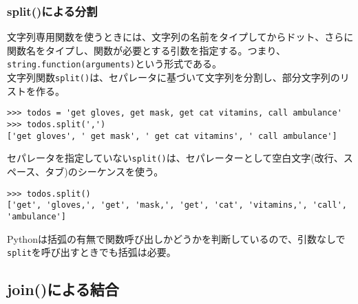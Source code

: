 \documentclass[11pt, oneside]{article}   	%
\begin{document}
 \subsubsection{split()による分割}
 文字列専用関数を使うときには、文字列の名前をタイプしてからドット、さらに関数名をタイプし、関数が必要とする引数を指定する。つまり、\verb|string.function(arguments)|という形式である。\\
 文字列関数\verb|split()|は、セパレータに基づいて文字列を分割し、部分文字列のリストを作る。
 \begin{lstlisting}
>>> todos = 'get gloves, get mask, get cat vitamins, call ambulance'
>>> todos.split(',')
['get gloves', ' get mask', ' get cat vitamins', ' call ambulance']
 \end{lstlisting}
 セパレータを指定していない\verb|split()|は、セパレーターとして空白文字(改行、スペース、タブ)のシーケンスを使う。
 \begin{lstlisting}
>>> todos.split()
['get', 'gloves,', 'get', 'mask,', 'get', 'cat', 'vitamins,', 'call', 'ambulance']
\end{lstlisting}
 Pythonは括弧の有無で関数呼び出しかどうかを判断しているので、引数なしで\verb|split|を呼び出すときでも括弧は必要。
 
 \subsection{join()による結合}
 
 
\end{document}
